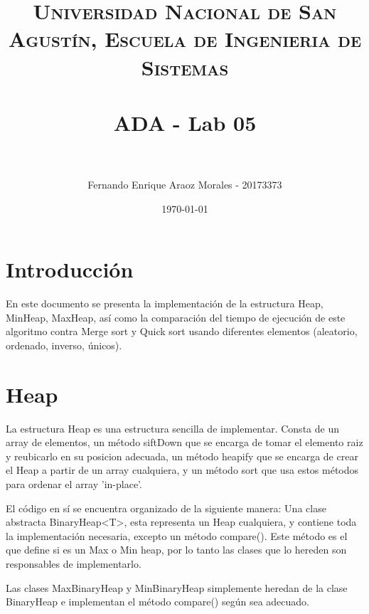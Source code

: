 \documentclass[paper=a4, fontsize=11pt]{scrartcl} %
\title{	
\normalfont \normalsize 
\textsc{Universidad Nacional de San Agustín, Escuela de Ingenieria de Sistemas} \\ [25pt] %
\horrule{0.5pt} \\[0.4cm] %
\huge ADA - Lab 05 \\ %
\horrule{2pt} \\[0.5cm] %
}
\author{Fernando Enrique Araoz Morales - 20173373} %
\date{\normalsize\today} %
\numberwithin{equation}{section} %
\numberwithin{figure}{section} %
\numberwithin{table}{section} %
\begin{document}
\maketitle %


\section{Introducción}\label{sec:introducción}

En este documento se presenta la implementación de la estructura Heap, MinHeap, MaxHeap, así como
la comparación del tiempo de ejecución de este algoritmo contra Merge sort y Quick sort usando
diferentes elementos (aleatorio, ordenado, inverso, únicos).


\section{Heap}\label{sec:heap}

    La estructura Heap es una estructura sencilla de implementar.
    Consta de un array de elementos, un método siftDown que se encarga de tomar el elemento raiz
    y reubicarlo en su posicion adecuada, un método heapify que se encarga de crear el Heap a partir
    de un array cualquiera, y un método sort que usa estos métodos para ordenar el array 'in-place'.


    El código en sí se encuentra organizado de la siguiente manera:
    Una clase abstracta BinaryHeap<T>, esta representa un Heap cualquiera, y contiene toda la
    implementación necesaria, excepto un método compare().
    Este método es el que define si es un Max o Min heap, por lo tanto las clases que lo hereden
    son responsables de implementarlo.

    Las clases MaxBinaryHeap y MinBinaryHeap simplemente heredan de la clase BinaryHeap e implementan
    el método compare() según sea adecuado.
\end{document}
